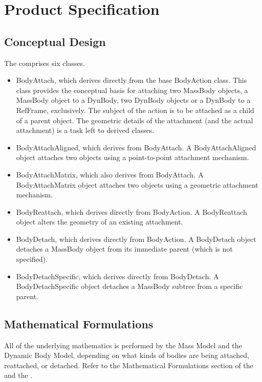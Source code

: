%

\chapter{Product Specification}\label{ch:\modelpartid:spec}

\section{Conceptual Design}
The \partxname comprises six classes.
\begin{itemize}
\item BodyAttach, which derives directly from the base BodyAction class.
This class provides the conceptual basis for attaching two MassBody objects, a MassBody object to a DynBody, two DynBody
objects or a DynBody to a RefFrame, exclusively.
The subject of the action is to be attached as a child of a parent object.
The geometric details of the attachment (and the actual attachment) is a task
left to derived classes.
\item BodyAttachAligned, which derives from BodyAttach.
A BodyAttachAligned object attaches two objects using a point-to-point
attachment mechanism.
\item BodyAttachMatrix, which also derives from BodyAttach.
A BodyAttachMatrix object attaches two objects using a geometric
attachment mechanism.
\item BodyReattach, which derives directly from BodyAction.
A BodyReattach object alters the geometry of an existing attachment.
\item BodyDetach, which derives directly from BodyAction.
A BodyDetach object detaches a MassBody object from its immediate
parent (which is not specified).
\item BodyDetachSpecific, which derives directly from BodyDetach.
A BodyDetachSpecific object detaches a MassBody subtree from a
specific parent.
\end{itemize}

\section{Mathematical Formulations}
All of the underlying mathematics is performed by the Mass Model
and the Dynamic Body Model, depending on what kinds of bodies are
being attached, reattached, or detached.
Refer to the Mathematical Formulations section of
the 
and the .

